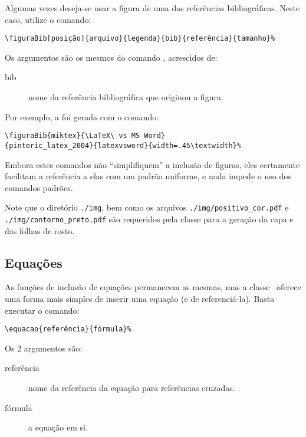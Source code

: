 Algumas vezes deseja-se usar a figura de uma das referências bibliográficas. Neste caso, utilize o 
comando:

\begin{verbatim}
\figuraBib[posição]{arquivo}{legenda}{bib}{referência}{tamanho}%
\end{verbatim}

Os argumentos são os mesmos do comando , acrescidos de:
\begin{description}
	\item[bib] nome da referência bibliográfica que originou a figura.
\end{description}

Por exemplo, a  foi gerada com o comando:
\begin{verbatim}
\figuraBib{miktex}{\LaTeX\ vs MS Word}
{pinteric_latex_2004}{latexvsword}{width=.45\textwidth}%
\end{verbatim}

Embora estes comandos não ``simplifiquem'' a inclusão de figuras, eles certamente facilitam a 
referência a elas com um padrão uniforme, e nada impede o uso dos comandos padrões.

%

Note que o diretório \texttt{{.}/img}, bem como os arquivos \texttt{./img/positivo\_cor.pdf} e 
\texttt{./img/contorno\_preto.pdf} são requeridos pela classe para a geração da capa e das folhas
de rosto.


\subsection{Equações}
As funções de inclusão de equações permanecem as mesmas, mas a classe \unbene\ oferece uma forma 
mais simples de inserir uma equação (e de referenciá-la). Basta executar o comando:

\begin{verbatim}
\equacao{referência}{fórmula}%
\end{verbatim}

Os 2 argumentos são:
\begin{description}
	\item[referência] nome da referência da equação para referências cruzadas.
	\item[fórmula] a equação em si.
\end{description}

